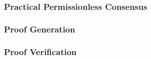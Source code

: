 \subsubsection{Practical Permissionless Consensus} \label{sec:pol-implementation:practical-permissionless-consensus}



\subsubsection{Proof Generation} \label{sec:pol-implementation:proof-generation}

\subsubsection{Proof Verification} \label{sec:pol-implementation:proof-verification}



